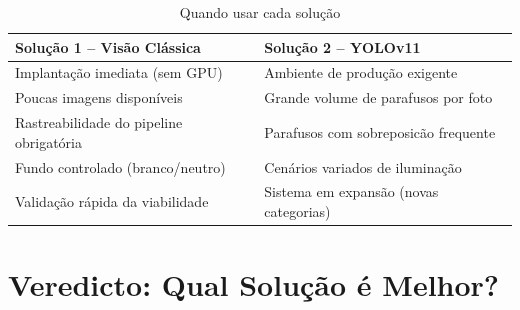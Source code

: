 \documentclass[12pt,a4paper]{article}
\begin{document}
\begin{table}[H]
  \centering
  \caption{Quando usar cada solu\c{c}\~ao}
  \label{tab:quando}
  \begin{tabular}{p{5.8cm}p{5.8cm}}
    \toprule
    \textbf{Solu\c{c}\~ao 1 -- Vis\~ao Cl\'assica} &
    \textbf{Solu\c{c}\~ao 2 -- YOLOv11} \\
    \midrule
    Implanta\c{c}\~ao imediata (sem GPU)
      & Ambiente de produ\c{c}\~ao exigente \\
    Poucas imagens dispon\'iveis
      & Grande volume de parafusos por foto \\
    Rastreabilidade do pipeline obrigat\'oria
      & Parafusos com sobreposic\~ao frequente \\
    Fundo controlado (branco/neutro)
      & Cen\'arios variados de ilumina\c{c}\~ao \\
    Valida\c{c}\~ao r\'apida da viabilidade
      & Sistema em expans\~ao (novas categorias) \\
    \bottomrule
  \end{tabular}
\end{table}

\section{Veredicto: Qual Solu\c{c}\~ao \'e Melhor?}
\label{sec:veredicto}
\end{document}
